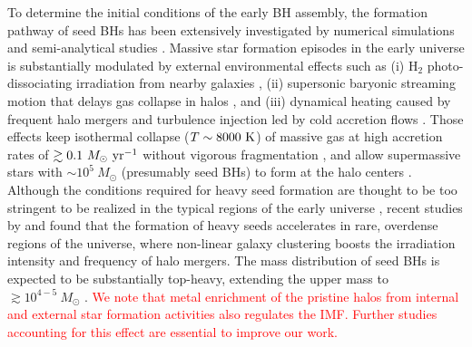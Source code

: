 \documentclass[twocolumn, twocolappendix]{aastex63}
\newcommand{\Msun}{M_\odot}
\newcommand{\Msunyr}{M_\odot~{\rm yr}^{-1}}
\newcommand{\red}[1]{\textcolor{red}{ #1}}
\begin{document}
\begin{CJK*}{UTF8}{gbsn}
To determine the initial conditions of the early BH assembly,
the formation pathway of seed BHs has been extensively investigated by numerical simulations and semi-analytical studies
\citep{2006MNRAS.370..289B,2009MNRAS.396..343R,2009ApJ...696.1798T,2012MNRAS.422.2051N,2014ApJ...781...60H,
2015MNRAS.448..568H,2018MNRAS.474.3825V,2021MNRAS.506..613S,2022arXiv220614459T,2022arXiv220505717B}.
Massive star formation episodes in the early universe is substantially modulated by external environmental effects such as
(i) H$_2$ photo-dissociating irradiation from nearby galaxies
\citep{2001ApJ...546..635O,2002ApJ...569..558O,2003Natur.425..812B,2010MNRAS.402.1249S,2014MNRAS.445..544S,2014MNRAS.445..107V,2016ApJ...832..134C},
(ii) supersonic baryonic streaming motion that delays gas collapse in halos
\citep{2012MNRAS.424.1335F, 2014MNRAS.439.1092T, 2018ApJ...855...17H,2017MNRAS.471.4878S,2018MNRAS.479.4017I},
and (iii) dynamical heating caused by frequent halo mergers and turbulence injection led by cold accretion flows
\citep{2003ApJ...592..645Y,2010Natur.466.1082M,2015ApJ...810...51M,2019Natur.566...85W,2022Natur.607...48L}.
Those effects keep isothermal collapse ($T\sim 8000~{\rm K}$) of massive gas at high accretion rates of $\gtrsim 0.1~\Msunyr$
without vigorous fragmentation \citep{2014MNRAS.445L.109I,2015MNRAS.446.2380B,2016PASA...33...51L},
and allow supermassive stars with $\sim 10^5~\Msun$ (presumably seed BHs) to form at the halo centers 
\citep{2013ApJ...778..178H,2013A&A...558A..59S,2019PASA...36...27W,2022arXiv220614459T}.
Although the conditions required for heavy seed formation are thought to be too stringent to be realized in the typical regions of the early universe
\citep{2008MNRAS.391.1961D,2009ApJ...695.1430A,2015MNRAS.450.4350I},
recent studies by \citet{2021MNRAS.503.5046L} and \citet{2021ApJ...917...60L} found that the formation of heavy seeds
accelerates in rare, overdense regions of the universe, where non-linear galaxy clustering boosts the irradiation intensity
and frequency of halo mergers.
The mass distribution of seed BHs is expected to be substantially top-heavy, extending the upper mass to $\gtrsim 10^{4-5}~\Msun$
\citep{2021ApJ...917...60L, 2022arXiv220614459T}.
\red{
We note that metal enrichment of the pristine halos from internal and external star formation activities also regulates the IMF.
Further studies accounting for this effect are essential to improve our work.
}



\end{CJK*}
\end{document}
